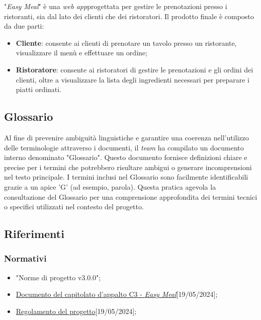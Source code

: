 "\textit{Easy Meal}" è una \textit{web app}\g progettata per gestire le
prenotazioni presso i ristoranti, sia dal lato dei clienti che dei ristoratori.
Il prodotto finale è composto da due parti:

\begin{itemize}
	\item \textbf{Cliente\g}: consente ai clienti di prenotare un tavolo presso un
	      ristorante, visualizzare il menù e effettuare un ordine\g;

	\item \textbf{Ristoratore}: consente ai ristoratori di gestire le
	      prenotazioni e gli ordini dei clienti, oltre a visualizzare la lista
	      degli ingredienti necessari per preparare i piatti ordinati.
\end{itemize}

\subsection{Glossario}

Al fine di prevenire ambiguità linguistiche e garantire una coerenza nell'utilizzo
delle terminologie attraverso i documenti, il \textit{team} ha compilato un documento
interno denominato "Glossario".
Questo documento fornisce definizioni chiare e precise per i termini che potrebbero
risultare ambigui o generare incomprensioni nel testo principale.
I termini inclusi nel Glossario sono facilmente identificabili grazie a un apice 'G'
(ad esempio, parola\g).
Questa pratica agevola la consultazione del Glossario per una comprensione approfondita
dei termini tecnici o specifici utilizzati nel contesto del progetto.

\subsection{Riferimenti}

\subsubsection{Normativi}
\begin{itemize}
	\item "Norme di progetto v3.0.0";
	\item 	\href{https://www.math.unipd.it/~tullio/IS-1/2023/Progetto/C3.pdf}
		{Documento del capitolato d'appalto C3 - \textit{Easy Meal}}[19/05/2024];
	\item \href{https://www.math.unipd.it/~tullio/IS-1/2023/Dispense/PD2.pdf}
		{Regolamento del progetto}[19/05/2024];
\end{itemize}


